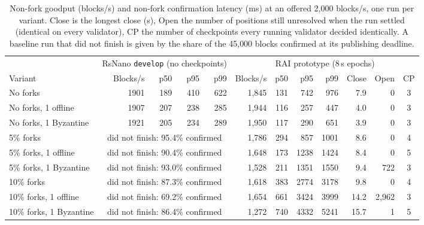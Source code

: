 \begin{table}[t]
\caption{Non-fork goodput (blocks/s) and non-fork confirmation latency (ms) at an offered 2{,}000 blocks/s, one run per variant. Close is the longest close (s), Open the number of positions still unresolved when the run settled (identical on every validator), CP the number of checkpoints every running validator decided identically. A baseline run that did not finish is given by the share of the 45{,}000 blocks confirmed at its publishing deadline.}
\label{tab:eval}
\centering
\footnotesize
\begin{tabular}{@{}lrrrrrrrrrrc@{}}
\toprule
& \multicolumn{4}{c}{RsNano \texttt{develop} (no checkpoints)} & \multicolumn{7}{c}{RAI prototype (8\,s epochs)}\\
\cmidrule(lr){2-5}\cmidrule(l){6-12}
Variant & Blocks/s & p50 & p95 & p99 & Blocks/s & p50 & p95 & p99 & Close & Open & CP\\
\midrule
No forks & 1901 & 189 & 410 & 622 & 1{,}845 & 131 & 742 & 976 & 7.9 & 0 & 3\\
No forks, 1 offline & 1907 & 207 & 238 & 285 & 1{,}944 & 116 & 257 & 447 & 4.0 & 0 & 3\\
No forks, 1 Byzantine & 1921 & 205 & 234 & 289 & 1{,}950 & 117 & 290 & 651 & 3.9 & 0 & 3\\
\midrule
5\% forks & \multicolumn{4}{c}{did not finish: 95.4\% confirmed} & 1{,}786 & 294 & 857 & 1001 & 8.6 & 0 & 4\\
5\% forks, 1 offline & \multicolumn{4}{c}{did not finish: 90.4\% confirmed} & 1{,}648 & 173 & 1238 & 1424 & 8.4 & 0 & 5\\
5\% forks, 1 Byzantine & \multicolumn{4}{c}{did not finish: 93.0\% confirmed} & 1{,}528 & 211 & 1351 & 1550 & 9.4 & 722 & 3\\
\midrule
10\% forks & \multicolumn{4}{c}{did not finish: 87.3\% confirmed} & 1{,}618 & 383 & 2774 & 3178 & 9.8 & 0 & 4\\
10\% forks, 1 offline & \multicolumn{4}{c}{did not finish: 69.2\% confirmed} & 1{,}654 & 661 & 3424 & 3999 & 14.2 & 2{,}962 & 3\\
10\% forks, 1 Byzantine & \multicolumn{4}{c}{did not finish: 86.4\% confirmed} & 1{,}272 & 740 & 4332 & 5241 & 15.7 & 1 & 5\\
\bottomrule
\end{tabular}
\end{table}
